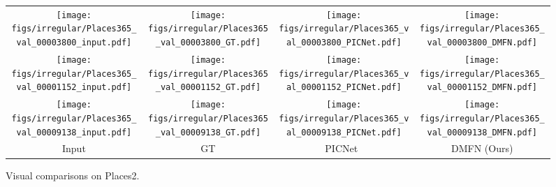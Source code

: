 \documentclass[journal]{IEEEtran}
\begin{document}
\begin{figure}[ht]
	\centering
	\begin{adjustbox}{valign=t}
		\begin{tabular}{cccc}
			
			\texttt{[image: figs/irregular/Places365\_val\_00003800\_input.pdf]} &
			\hspace{-4mm}
			\texttt{[image: figs/irregular/Places365\_val\_00003800\_GT.pdf]} &
			\hspace{-4mm}
			\texttt{[image: figs/irregular/Places365\_val\_00003800\_PICNet.pdf]} &
			\hspace{-4mm}
			\texttt{[image: figs/irregular/Places365\_val\_00003800\_DMFN.pdf]}\\
			
			\texttt{[image: figs/irregular/Places365\_val\_00001152\_input.pdf]} &
			\hspace{-4mm}
			\texttt{[image: figs/irregular/Places365\_val\_00001152\_GT.pdf]} &
			\hspace{-4mm}
			\texttt{[image: figs/irregular/Places365\_val\_00001152\_PICNet.pdf]} &
			\hspace{-4mm}
			\texttt{[image: figs/irregular/Places365\_val\_00001152\_DMFN.pdf]}\\
			
			\texttt{[image: figs/irregular/Places365\_val\_00009138\_input.pdf]} &
			\hspace{-4mm}
			\texttt{[image: figs/irregular/Places365\_val\_00009138\_GT.pdf]} &
			\hspace{-4mm}
			\texttt{[image: figs/irregular/Places365\_val\_00009138\_PICNet.pdf]} &
			\hspace{-4mm}
			\texttt{[image: figs/irregular/Places365\_val\_00009138\_DMFN.pdf]}\\
			
			Input & \hspace{-4mm} GT & \hspace{-4mm} PICNet~\cite{PICNet} & \hspace{-4mm} DMFN (Ours) \\
		\end{tabular}
	\end{adjustbox}
	\caption{Visual comparisons on Places2.}
	\label{fig:places2}
\end{figure}
\end{document}
